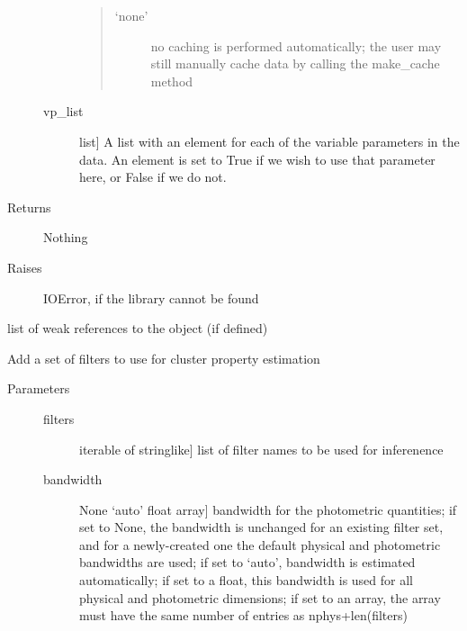 \documentclass[letterpaper,10pt,english]{sphinxmanual}
\begin{document}
\begin{fulllineitems}
\begin{fulllineitems}
\begin{description}
\begin{description}
\begin{quote}
\begin{description}
\item[{‘none’}] \leavevmode
no caching is performed automatically; the user
may still manually cache data by calling
the make\_cache method

\end{description}
\end{quote}

\item[{vp\_list}] \leavevmode{[}list{]}
A list with an element for each of the variable parameters
in the data. An element is set to True if we wish to use
that parameter here, or False if we do not.

\end{description}

\item[{Returns}] \leavevmode
Nothing

\item[{Raises}] \leavevmode
IOError, if the library cannot be found

\end{description}

\end{fulllineitems}


\begin{fulllineitems}
\label{\detokenize{cluster_slug:slugpy.cluster_slug.cluster_slug.__weakref__}}
list of weak references to the object (if defined)

\end{fulllineitems}


\begin{fulllineitems}
\label{\detokenize{cluster_slug:slugpy.cluster_slug.cluster_slug.add_filters}}
Add a set of filters to use for cluster property estimation
\begin{description}
\item[{Parameters}] \leavevmode\begin{description}
\item[{filters}] \leavevmode{[}iterable of stringlike{]}
list of filter names to be used for inferenence

\item[{bandwidth}] \leavevmode{[}None \textbar{} ‘auto’ \textbar{} float \textbar{} array{]}
bandwidth for the photometric quantities; if set to
None, the bandwidth is unchanged for an existing filter
set, and for a newly-created one the default physical
and photometric bandwidths are used; if set to ‘auto’,
bandwidth is estimated automatically; if set to a float,
this bandwidth is used for all physical and photometric
dimensions; if set to an array, the array must have the
same number of entries as nphys+len(filters)


\end{description}
\end{description}
\end{fulllineitems}
\end{fulllineitems}
\end{document}
